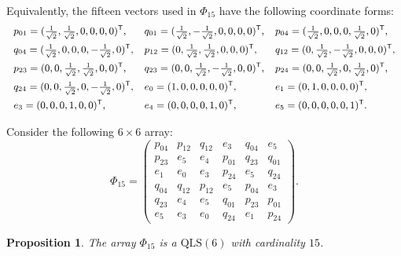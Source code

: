 \documentclass[a4paper,11pt]{article}
\newcommand{\QLS}{\mathrm{QLS}}
\newtheorem{proposition}{Proposition}
\begin{document}
Equivalently, the fifteen vectors used in $\Phi_{15}$ have the following
coordinate forms:
\[
\small
\begin{array}{lll}
 p_{01}=(\frac1{\sqrt2},\frac1{\sqrt2},0,0,0,0)^{\mathsf T},
& q_{01}=(\frac1{\sqrt2},-\frac1{\sqrt2},0,0,0,0)^{\mathsf T},
& p_{04}=(\frac1{\sqrt2},0,0,0,\frac1{\sqrt2},0)^{\mathsf T},\\[2mm]
 q_{04}=(\frac1{\sqrt2},0,0,0,-\frac1{\sqrt2},0)^{\mathsf T},
& p_{12}=(0,\frac1{\sqrt2},\frac1{\sqrt2},0,0,0)^{\mathsf T},
& q_{12}=(0,\frac1{\sqrt2},-\frac1{\sqrt2},0,0,0)^{\mathsf T},\\[2mm]
 p_{23}=(0,0,\frac1{\sqrt2},\frac1{\sqrt2},0,0)^{\mathsf T},
& q_{23}=(0,0,\frac1{\sqrt2},-\frac1{\sqrt2},0,0)^{\mathsf T},
& p_{24}=(0,0,\frac1{\sqrt2},0,\frac1{\sqrt2},0)^{\mathsf T},\\[2mm]
 q_{24}=(0,0,\frac1{\sqrt2},0,-\frac1{\sqrt2},0)^{\mathsf T},
& e_0=(1,0,0,0,0,0)^{\mathsf T},
& e_1=(0,1,0,0,0,0)^{\mathsf T},\\[2mm]
 e_3=(0,0,0,1,0,0)^{\mathsf T},
& e_4=(0,0,0,0,1,0)^{\mathsf T},
& e_5=(0,0,0,0,0,1)^{\mathsf T}.
\end{array}
\]

Consider the following $6\times6$ array:
\[
\Phi_{15}=
\begin{pmatrix}
 p_{04}&p_{12}&q_{12}&e_3&q_{04}&e_5\\
 p_{23}&e_5&e_4&p_{01}&q_{23}&q_{01}\\
 e_1&e_0&e_3&p_{24}&e_5&q_{24}\\
 q_{04}&q_{12}&p_{12}&e_5&p_{04}&e_3\\
 q_{23}&e_4&e_5&q_{01}&p_{23}&p_{01}\\
 e_5&e_3&e_0&q_{24}&e_1&p_{24}
\end{pmatrix}.
\]

\begin{proposition}
The array $\Phi_{15}$ is a $\QLS(6)$ with cardinality $15$.
\end{proposition}
\end{document}
